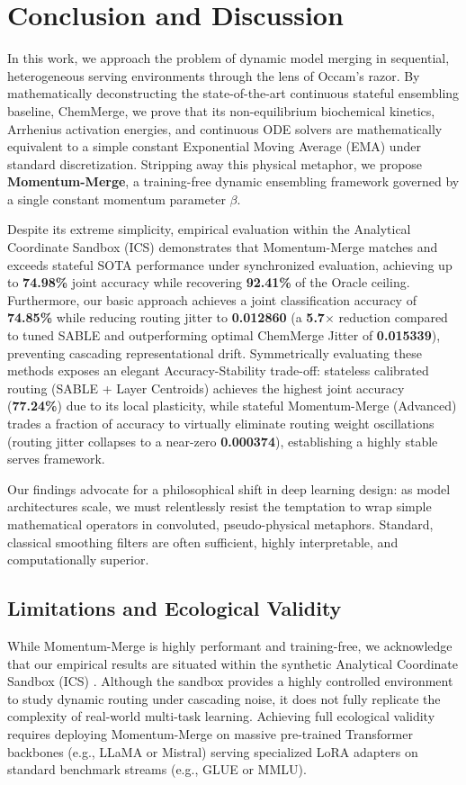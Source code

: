 \section{Conclusion and Discussion}
\label{sec:conclusion}

In this work, we approach the problem of dynamic model merging in sequential, heterogeneous serving environments through the lens of Occam's razor. By mathematically deconstructing the state-of-the-art continuous stateful ensembling baseline, ChemMerge, we prove that its non-equilibrium biochemical kinetics, Arrhenius activation energies, and continuous ODE solvers are mathematically equivalent to a simple constant Exponential Moving Average (EMA) under standard discretization. Stripping away this physical metaphor, we propose \textbf{Momentum-Merge}, a training-free dynamic ensembling framework governed by a single constant momentum parameter $\beta$.

Despite its extreme simplicity, empirical evaluation within the Analytical Coordinate Sandbox (ICS) demonstrates that Momentum-Merge matches and exceeds stateful SOTA performance under synchronized evaluation, achieving up to \textbf{74.98\%} joint accuracy while recovering \textbf{92.41\%} of the Oracle ceiling. Furthermore, our basic approach achieves a joint classification accuracy of \textbf{74.85\%} while reducing routing jitter to \textbf{0.012860} (a \textbf{5.7$\times$} reduction compared to tuned SABLE and outperforming optimal ChemMerge Jitter of \textbf{0.015339}), preventing cascading representational drift. Symmetrically evaluating these methods exposes an elegant Accuracy-Stability trade-off: stateless calibrated routing (SABLE + Layer Centroids) achieves the highest joint accuracy (\textbf{77.24\%}) due to its local plasticity, while stateful Momentum-Merge (Advanced) trades a fraction of accuracy to virtually eliminate routing weight oscillations (routing jitter collapses to a near-zero \textbf{0.000374}), establishing a highly stable serves framework.

Our findings advocate for a philosophical shift in deep learning design: as model architectures scale, we must relentlessly resist the temptation to wrap simple mathematical operators in convoluted, pseudo-physical metaphors. Standard, classical smoothing filters are often sufficient, highly interpretable, and computationally superior.

\subsection{Limitations and Ecological Validity}
While Momentum-Merge is highly performant and training-free, we acknowledge that our empirical results are situated within the synthetic Analytical Coordinate Sandbox (ICS) \cite{chemmerge}. Although the sandbox provides a highly controlled environment to study dynamic routing under cascading noise, it does not fully replicate the complexity of real-world multi-task learning. Achieving full ecological validity requires deploying Momentum-Merge on massive pre-trained Transformer backbones (e.g., LLaMA or Mistral) serving specialized LoRA adapters on standard benchmark streams (e.g., GLUE or MMLU). 

